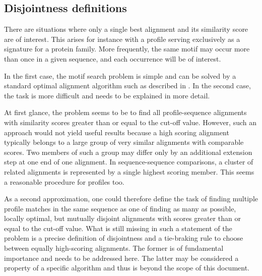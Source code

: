 \documentclass[a4paper,10pt,twoside]{scrartcl}
\begin{document}
  \subsection{Disjointness definitions}

  There are situations where only a single best alignment and its similarity score are of interest. This arises for instance with a profile serving
  exclusively as a signature for a protein family.  More frequently, the same motif may occur more than once in a given sequence, and each occurrence will be of interest.

  In the first case, the motif search problem is simple and can be solved by a standard optimal alignment algorithm such as described in \cite{Gribskov90}. In the
  second case, the task is more difficult and needs to be explained in more detail.

  At first glance, the problem seems to be to find all profile-sequence alignments with similarity scores greater than or equal to the cut-off
  value. However, such an approach would not yield useful results because a high scoring alignment typically belongs to a large group of very similar
  alignments with comparable scores. Two members of such a group may differ only by an additional extension step at one end of one alignment. In
  sequence-sequence comparisons, a cluster of related  alignments  is represented by a single highest scoring member. This seems a reasonable
  procedure for profiles too.

  As a second approximation, one could therefore define the task of finding multiple profile matches in the same sequence as one of finding as many as
  possible, locally optimal, but mutually disjoint alignments with scores greater than or equal to the cut-off value. What is still missing in such
  a statement of the problem is a precise definition of disjointness and a tie-braking rule to choose between equally high-scoring alignments. The
  former is of fundamental importance and needs to be addressed here.  The latter may be considered a property of a specific algorithm and thus is
  beyond the scope of this document.
\end{document}

